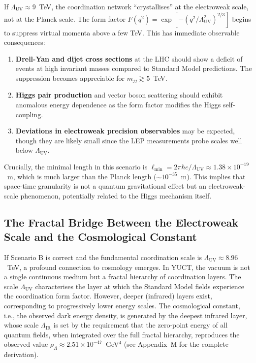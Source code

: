 \documentclass[12pt,a4paper]{article}
\newcommand{\Lmin}{\ell_{\min}}
\newcommand{\LUV}{\Lambda_{\mathrm{UV}}}
\theoremstyle{remark}
\begin{document}
	If \(\LUV \approx 9\)~TeV, the coordination network ``crystallises'' at the electroweak scale, not at the Planck scale.  The form factor \(F(q^2) = \exp[-(q^2/\LUV^2)^{2/3}]\) begins to suppress virtual momenta above a few TeV.  This has immediate observable consequences:
	
	\begin{enumerate}[label=(\arabic*)]
		\item \textbf{Drell-Yan and dijet cross sections} at the LHC should show a deficit of events at high invariant masses compared to Standard Model predictions.  The suppression becomes appreciable for \(m_{jj} \gtrsim 5\)~TeV.
		\item \textbf{Higgs pair production} and vector boson scattering should exhibit anomalous energy dependence as the form factor modifies the Higgs self-coupling.
		\item \textbf{Deviations in electroweak precision observables} may be expected, though they are likely small since the LEP measurements probe scales well below \(\LUV\).
	\end{enumerate}
	
	Crucially, the minimal length in this scenario is \(\Lmin = 2\pi\hbar c/\LUV \approx 1.38\times 10^{-19}\)~m, which is much larger than the Planck length (\(\sim 10^{-35}\)~m).  This implies that space-time granularity is not a quantum gravitational effect but an electroweak-scale phenomenon, potentially related to the Higgs mechanism itself.
	
	\subsection{The Fractal Bridge Between the Electroweak Scale and the Cosmological Constant}
	\label{subsec:bridge}
	
	If Scenario B is correct and the fundamental coordination scale is 
	\(\LUV \approx 8.96\)~TeV, a profound connection to cosmology emerges.  
	In YUCT, the vacuum is not a single continuous medium but a fractal 
	hierarchy of coordination layers.  The scale \(\LUV\) characterises the 
	layer at which the Standard Model fields experience the coordination 
	form factor.  However, deeper (infrared) layers exist, corresponding to 
	progressively lower energy scales.  The cosmological constant, i.e., 
	the observed dark energy density, is generated by the deepest infrared 
	layer, whose scale \(\Lambda_{\mathrm{IR}}\) is set by the requirement 
	that the zero‑point energy of all quantum fields, when integrated over 
	the full fractal hierarchy, reproduces the observed value 
	\(\rho_{\Lambda} \approx 2.51 \times 10^{-47}\)~GeV\(^4\) (see 
	Appendix~M for the complete derivation).
	
\end{document}
